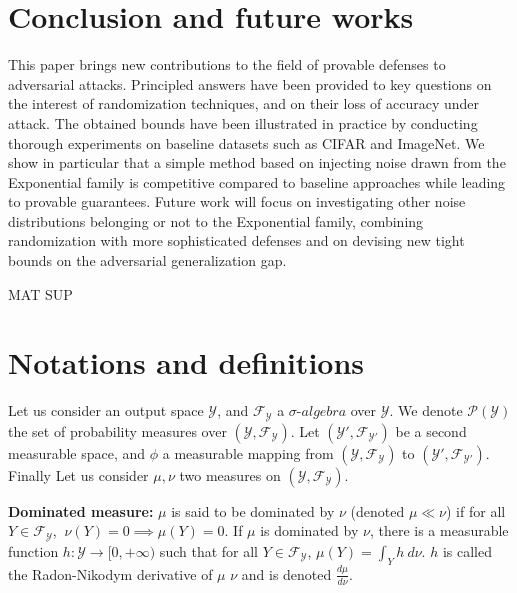 \section{Conclusion and future works}
\label{section:ap2-conclusion}

This paper brings new contributions to the field of provable defenses to adversarial attacks. Principled answers have been provided to key questions on the interest of randomization techniques, and on their loss of accuracy under attack. The obtained bounds have been illustrated in practice by conducting thorough experiments on baseline datasets such as CIFAR and ImageNet. We show in particular that a simple method based on injecting noise drawn from the Exponential family is competitive compared to baseline approaches while leading to provable guarantees. Future work will focus on investigating other noise distributions belonging or not to the Exponential family, combining randomization with more sophisticated defenses and on devising new tight bounds on the adversarial generalization gap.


\begin{Large}
MAT SUP
\end{Large}

\section{Notations and definitions}

Let us consider an output space $\mathcal{Y}$, and $\mathcal{F}_{\mathcal{Y}}$ a $\sigma$-$ algebra$ over $\mathcal{Y}$. We denote $\mathcal{P}(\mathcal{Y})$ the set of probability measures over $(\mathcal{Y},\mathcal{F}_{\mathcal{Y}})$.
Let $(\mathcal{Y'},\mathcal{F}_{\mathcal{Y'}})$ be a second measurable space, and $\phi$ a measurable mapping from $(\mathcal{Y},\mathcal{F}_{\mathcal{Y}})$ to $(\mathcal{Y'},\mathcal{F}_{\mathcal{Y'}})$. Finally Let us consider $\mu,\nu$ two measures on $(\mathcal{Y},\mathcal{F}_{\mathcal{Y}})$.

\textbf{Dominated measure:} $\mu$ is said to be dominated by $\nu$ (denoted $\mu \ll \nu$) if for all $Y \in \mathcal{F}_{\mathcal{Y}}$, $\ \nu(Y) = 0 \implies \mu(Y)=0$. If $\mu$ is dominated by $\nu$, there is a measurable function $h : \mathcal{Y} \rightarrow [0,+\infty)$ such that for all $Y \in \mathcal{F}_{\mathcal{Y}}$, $ \mu(Y)=\int_{Y} h \ d\nu$. $ h $ is called the Radon-Nikodym derivative of $\mu$ \wrt $\nu$ and is denoted $\frac{d \mu}{d \nu}$.
   
